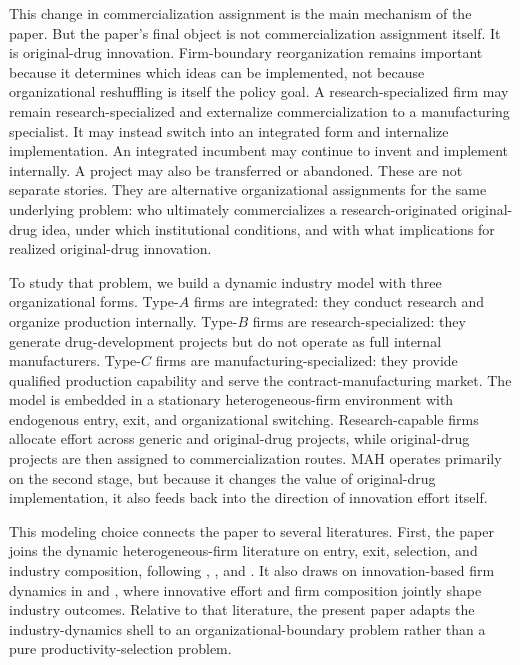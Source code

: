 \documentclass[12pt]{article}
\begin{document}
This change in commercialization assignment is the main mechanism of the paper. But the paper's final object is not commercialization assignment itself. It is original-drug innovation. Firm-boundary reorganization remains important because it determines which ideas can be implemented, not because organizational reshuffling is itself the policy goal. A research-specialized firm may remain research-specialized and externalize commercialization to a manufacturing specialist. It may instead switch into an integrated form and internalize implementation. An integrated incumbent may continue to invent and implement internally. A project may also be transferred or abandoned. These are not separate stories. They are alternative organizational assignments for the same underlying problem: who ultimately commercializes a research-originated original-drug idea, under which institutional conditions, and with what implications for realized original-drug innovation.

To study that problem, we build a dynamic industry model with three organizational forms. Type-$A$ firms are integrated: they conduct research and organize production internally. Type-$B$ firms are research-specialized: they generate drug-development projects but do not operate as full internal manufacturers. Type-$C$ firms are manufacturing-specialized: they provide qualified production capability and serve the contract-manufacturing market. The model is embedded in a stationary heterogeneous-firm environment with endogenous entry, exit, and organizational switching. Research-capable firms allocate effort across generic and original-drug projects, while original-drug projects are then assigned to commercialization routes. MAH operates primarily on the second stage, but because it changes the value of original-drug implementation, it also feeds back into the direction of innovation effort itself.

This modeling choice connects the paper to several literatures. First, the paper joins the dynamic heterogeneous-firm literature on entry, exit, selection, and industry composition, following \citet{Jovanovic1982}, \citet{Hopenhayn1992}, and \citet{EricsonPakes1995}. It also draws on innovation-based firm dynamics in \citet{KletteKortum2004} and \citet{AkcigitKerr2018}, where innovative effort and firm composition jointly shape industry outcomes. Relative to that literature, the present paper adapts the industry-dynamics shell to an organizational-boundary problem rather than a pure productivity-selection problem.
\end{document}
